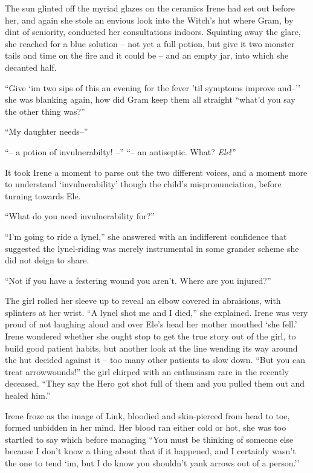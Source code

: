\documentclass[../../FGP.tex]{subfiles}
\begin{document}
The sun glinted off the myriad glazes on the ceramics Irene had set out before her, and again she stole an envious look into the Witch's hut where Gram, by dint of seniority, conducted her consultations indoors. Squinting away the glare, she reached for a blue solution -- not yet a full potion, but give it two monster tails and time on the fire and it could be -- and an empty jar, into which she decanted half. 

``Give `im two sips of this an evening for the fever 'til symptoms improve and--'' she was blanking again, how did Gram keep them all straight ``what'd you say the other thing was?''

``My daughter needs--''

``-- a potion of invulnerabilty! --''
``-- an antiseptic. What? \emph{Ele}!'' %

It took Irene a moment to parse out the two different voices, and a moment more to understand `invulnerability' though the child's mispronunciation, before turning towards Ele. 

``What do you need invulnerability for?''

``I'm going to ride a lynel,'' she answered with an indifferent confidence that suggested the lynel-riding was merely instrumental in some grander scheme she did not deign to share.

``Not if you have a festering wound you aren't. Where are you injured?''

The girl rolled her sleeve up to reveal an elbow covered in abraisions, with splinters at her wrist. ``A lynel shot me and I died,'' she explained. Irene was very proud of not laughing aloud and over Ele's head her mother mouthed `she fell.' Irene wondered whether she ought stop to get the true story out of the girl, to build good patient habits, but another look at the line wending its way around the hut decided against it -- too many other patients to slow down. ``But you can treat arrowwounds!'' the girl chirped with an enthusiasm rare in the recently deceased. ``They say the Hero got shot full of them and you pulled them out and healed him.'' 

Irene froze as the image of Link, bloodied and skin-pierced from head to toe, formed unbidden in her mind. Her blood ran either cold or hot, she was too startled to say which before managing ``You must be thinking of someone else because I don't know a thing about that if it happened, and I certainly wasn't the one to tend `im, but I do know you shouldn't yank arrows out of a person.''
\end{document}
